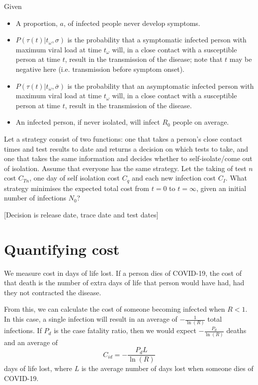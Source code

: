 \documentclass{article}
\begin{document}
Given
\begin{itemize}
\item A proportion, $a$, of infected people never develop symptoms.

\item $P(\tau(t)|t_\omega, \sigma)$ is the probability that a symptomatic infected person with maximum viral load at time $t_\omega$ will, in a close contact with a susceptible person at time $t$, result in the transmission of the disease; note that $t$ may be negative here (i.e. transmission before symptom onset).

\item $P(\tau(t)|t_\omega, \bar{\sigma})$ is the probability that an asymptomatic infected person with maximum viral load at time $t_\omega$ will, in a close contact with a susceptible person at time $t$, result in the transmission of the disease.

\item An infected person, if never isolated, will infect $R_0$ people on average.
\end{itemize}

Let a strategy consist of two functions: one that takes a person's close contact times and test results to date and returns a decision on which tests to take, and one that takes the same information and decides whether to self-isolate/come out of isolation. Assume that everyone has the same strategy. Let the taking of test $n$ cost $C_{Tn}$, one day of self isolation cost $C_q$ and each new infection cost $C_I$. What strategy minimises the expected total cost from $t=0$ to $t=\infty$, given an initial number of infections $N_0$?

[Decision is release date, trace date and test dates]


\section{Quantifying cost}

We measure cost in days of life lost. If a person dies of COVID-19, the cost of that death is the number of extra days of life that person would have had, had they not contracted the disease.

From this, we can calculate the cost of someone becoming infected when $R<1$. In this case, a single infection will result in an average of $-\frac{1}{\ln(R)}$ total infections. If $P_d$ is the case fatality ratio, then we would expect $-\frac{P_d}{\ln(R)}$ deaths and an average of
\[
C_{id} = -\frac{P_dL}{\ln(R)}
\]
days of life lost, where $L$ is the average number of days lost when someone dies of COVID-19.
\end{document}
